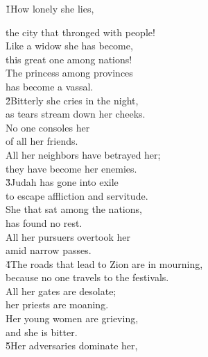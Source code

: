 


\v{1}How lonely she lies,

\begin{poetry}
\poemll    the city that thronged with people! \\
\poeml Like a widow she has become, \\
\poemll    this great one among nations! \\
\poeml The princess among provinces \\
\poemll    has become a vassal. \\
\poeml \v{2}Bitterly she cries in the night, \\
\poemll    as tears stream down her cheeks. \\
\poeml No one consoles her \\
\poemll    of all her friends. \\
\poeml All her neighbors have betrayed her; \\
\poemll    they have become her enemies. \\
\poeml \v{3}Judah has gone into exile \\
\poemll    to escape affliction and servitude. \\
\poeml She that sat among the nations, \\
\poemll    has found no rest. \\
\poeml All her pursuers overtook her \\
\poemll    amid narrow passes. \\
\poeml \v{4}The roads that lead to Zion are in mourning, \\
\poemll    because no one travels to the festivals. \\
\poeml All her gates are desolate; \\
\poemll    her priests are moaning. \\
\poeml Her young women are grieving, \\
\poemll    and she is bitter. \\
\poeml \v{5}Her adversaries dominate her, \\

\end{poetry}
